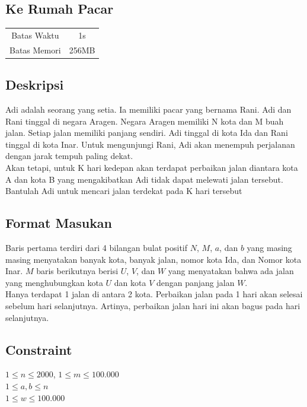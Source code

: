 \documentclass{article}
\begin{document}
\begin{center}

    
    \section*{Ke Rumah Pacar} %

    \begin{tabular}{ | c c | }
        \hline
        Batas Waktu  & 1s \\    %
        Batas Memori & 256MB \\  %
        \hline
    \end{tabular}
\end{center}

\subsection*{Deskripsi}
Adi adalah seorang yang setia. Ia memiliki pacar yang bernama Rani. Adi dan Rani tinggal di negara Aragen. Negara Aragen memiliki N kota dan M buah jalan. Setiap jalan memiliki panjang sendiri. Adi tinggal di kota Ida dan Rani tinggal di kota Inar. Untuk mengunjungi Rani, Adi akan menempuh perjalanan dengan jarak tempuh paling dekat. \\

Akan tetapi, untuk K hari kedepan akan terdapat perbaikan jalan diantara kota A dan kota B yang mengakibatkan Adi tidak dapat melewati jalan tersebut. Bantulah Adi untuk mencari jalan terdekat pada K hari tersebut

\subsection*{Format Masukan}

Baris pertama terdiri dari 4 bilangan bulat positif $N$, $M$, $a$, dan $b$ yang masing masing menyatakan banyak kota, banyak jalan, nomor kota Ida, dan Nomor kota Inar.
$M$ baris berikutnya berisi $U$, $V$, dan $W$ yang menyatakan bahwa ada jalan yang menghubungkan kota $U$ dan kota $V$ dengan panjang jalan $W$.\\
Hanya terdapat 1 jalan di antara 2 kota.
Perbaikan jalan pada 1 hari akan selesai sebelum hari selanjutnya. Artinya, perbaikan jalan hari ini akan bagus pada hari selanjutnya.


\subsection*{Constraint}
$1 \leq n \leq 2000$, $1 \leq m \leq 100.000$\\
$1 \leq a,b \leq n$\\
$1 \leq w \leq 100.000$\\
\end{document}

